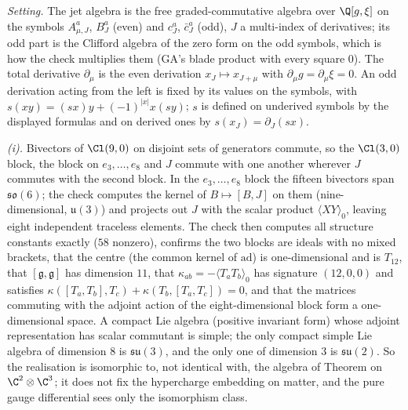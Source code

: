 \emph{Setting.} The jet algebra is the free graded-commutative algebra over $\Q[g, \xi]$ on the symbols $A^{a}_{\mu, J}$, $B^{a}_{J}$ (even) and $c^{a}_{J}$, $\bar c^{a}_{J}$ (odd), $J$ a multi-index of derivatives; its odd part is the Clifford algebra of the zero form on the odd symbols, which is how the check multiplies them (GA's blade product with every square $0$). The total derivative $\partial_\mu$ is the even derivation $x_{J} \mapsto x_{J + \mu}$ with $\partial_\mu g = \partial_\mu \xi = 0$. An odd derivation acting from the left is fixed by its values on the symbols, with $s(xy) = (sx)y + (-1)^{|x|}x(sy)$; $s$ is defined on underived symbols by the displayed formulas and on derived ones by $s(x_{J}) = \partial_{J}(sx)$.

\emph{(i).} Bivectors of $\Cl(9,0)$ on disjoint sets of generators commute, so the $\Cl(3,0)$ block, the block on $e_3, \dots, e_8$ and $J$ commute with one another wherever $J$ commutes with the second block. In the $e_3, \dots, e_8$ block the fifteen bivectors span $\mathfrak{so}(6)$; the check computes the kernel of $B \mapsto [B, J]$ on them (nine-dimensional, $\mathfrak{u}(3)$) and projects out $J$ with the scalar product $\langle XY\rangle_0$, leaving eight independent traceless elements. The check then computes all structure constants exactly ($58$ nonzero), confirms the two blocks are ideals with no mixed brackets, that the centre (the common kernel of $\mathrm{ad}$) is one-dimensional and is $T_{12}$, that $[\mathfrak{g}, \mathfrak{g}]$ has dimension $11$, that $\kappa_{ab} = -\langle T_aT_b\rangle_0$ has signature $(12, 0, 0)$ and satisfies $\kappa([T_a, T_b], T_c) + \kappa(T_b, [T_a, T_c]) = 0$, and that the matrices commuting with the adjoint action of the eight-dimensional block form a one-dimensional space. A compact Lie algebra (positive invariant form) whose adjoint representation has scalar commutant is simple; the only compact simple Lie algebra of dimension $8$ is $\mathfrak{su}(3)$, and the only one of dimension $3$ is $\mathfrak{su}(2)$. So the realisation is isomorphic to, not identical with, the algebra of Theorem  on $\C^{2} \otimes \C^{3}$; it does not fix the hypercharge embedding on matter, and the pure gauge differential sees only the isomorphism class.

